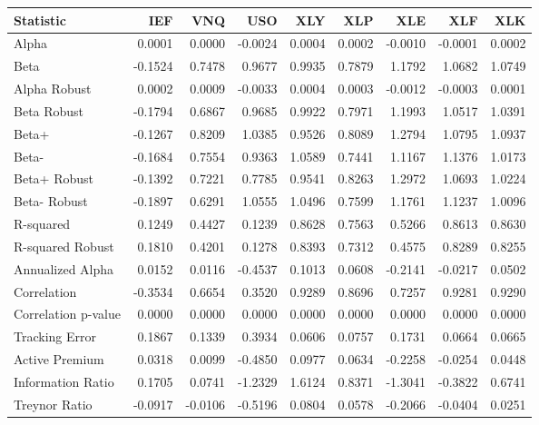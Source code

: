 \begin{tabular}{lrrrrrrrr}
\toprule
Statistic & IEF & VNQ & USO & XLY & XLP & XLE & XLF & XLK \\
\midrule
Alpha & 0.0001 & 0.0000 & -0.0024 & 0.0004 & 0.0002 & -0.0010 & -0.0001 & 0.0002 \\
Beta & -0.1524 & 0.7478 & 0.9677 & 0.9935 & 0.7879 & 1.1792 & 1.0682 & 1.0749 \\
Alpha Robust & 0.0002 & 0.0009 & -0.0033 & 0.0004 & 0.0003 & -0.0012 & -0.0003 & 0.0001 \\
Beta Robust & -0.1794 & 0.6867 & 0.9685 & 0.9922 & 0.7971 & 1.1993 & 1.0517 & 1.0391 \\
Beta+ & -0.1267 & 0.8209 & 1.0385 & 0.9526 & 0.8089 & 1.2794 & 1.0795 & 1.0937 \\
Beta- & -0.1684 & 0.7554 & 0.9363 & 1.0589 & 0.7441 & 1.1167 & 1.1376 & 1.0173 \\
Beta+ Robust & -0.1392 & 0.7221 & 0.7785 & 0.9541 & 0.8263 & 1.2972 & 1.0693 & 1.0224 \\
Beta- Robust & -0.1897 & 0.6291 & 1.0555 & 1.0496 & 0.7599 & 1.1761 & 1.1237 & 1.0096 \\
R-squared & 0.1249 & 0.4427 & 0.1239 & 0.8628 & 0.7563 & 0.5266 & 0.8613 & 0.8630 \\
R-squared Robust & 0.1810 & 0.4201 & 0.1278 & 0.8393 & 0.7312 & 0.4575 & 0.8289 & 0.8255 \\
Annualized Alpha & 0.0152 & 0.0116 & -0.4537 & 0.1013 & 0.0608 & -0.2141 & -0.0217 & 0.0502 \\
Correlation & -0.3534 & 0.6654 & 0.3520 & 0.9289 & 0.8696 & 0.7257 & 0.9281 & 0.9290 \\
Correlation p-value & 0.0000 & 0.0000 & 0.0000 & 0.0000 & 0.0000 & 0.0000 & 0.0000 & 0.0000 \\
Tracking Error & 0.1867 & 0.1339 & 0.3934 & 0.0606 & 0.0757 & 0.1731 & 0.0664 & 0.0665 \\
Active Premium & 0.0318 & 0.0099 & -0.4850 & 0.0977 & 0.0634 & -0.2258 & -0.0254 & 0.0448 \\
Information Ratio & 0.1705 & 0.0741 & -1.2329 & 1.6124 & 0.8371 & -1.3041 & -0.3822 & 0.6741 \\
Treynor Ratio & -0.0917 & -0.0106 & -0.5196 & 0.0804 & 0.0578 & -0.2066 & -0.0404 & 0.0251 \\
\bottomrule
\end{tabular}
